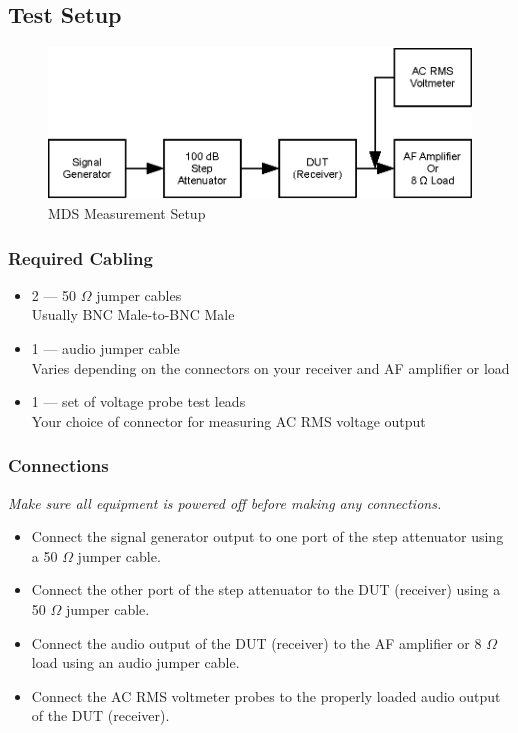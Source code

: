 \documentclass[10pt,letterpaper]{book}
\begin{document}
\subsection*{Test Setup}
\begin{figure}
\centering
\includegraphics[scale=1]{Illustrations/MDSSetup}
\caption{MDS Measurement Setup}
\end{figure}
\subsubsection*{Required Cabling}
\begin{itemize}
	\item 2 --- 50 $\Omega$ jumper cables \\
		Usually BNC Male-to-BNC Male
	\item 1 --- audio jumper cable \\
		Varies depending on the connectors on your receiver and AF amplifier or load
	\item 1 --- set of voltage probe test leads \\
		Your choice of connector for measuring AC RMS voltage output
\end{itemize}
\subsubsection*{Connections}
\emph{Make sure all equipment is powered off before making any connections.}
\begin{itemize}
	\item Connect the signal generator output to one port of the step attenuator using a 50 $\Omega$ jumper cable.
	\item Connect the other port of the step attenuator to the DUT (receiver) using a 50 $\Omega$ jumper cable.
	\item Connect the audio output of the DUT (receiver) to the AF amplifier or 8 $\Omega$ load using an audio jumper cable.
	\item Connect the AC RMS voltmeter probes to the properly loaded audio output of the DUT (receiver).
\end{itemize}
\end{document}
